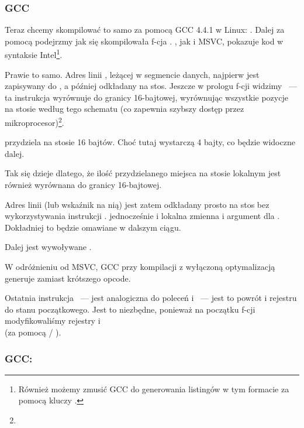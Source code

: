 \subsubsection{GCC}

Teraz chcemy skompilować to samo za pomocą GCC 4.4.1 w Linux: .
Dalej za pomocą \IDA podejrzmy jak się skompilowała f-cja \main.
\IDA, jak i MSVC, pokazuje kod w syntaksie Intel\footnote{Również możemy zmusić GCC do generowania listingów w tym formacie za pomocą kluczy .}.



Prawie to samo. 
Adres linii , leżącej w segmencie danych, najpierw jest zapisywany do \EAX, a później odkładany na stos.
Jeszcze w prologu f-cji widzimy ~--- 
ta instrukcja wyrównuje \ESP do granicy 16-bajtowej, wyrównując wszystkie pozycje 
na stosie według tego schematu (co zapewnia szybszy dostęp przez mikroprocesor)\footnote{\URLWPDA}.

 przydziela na stosie 16 bajtów. Choć tutaj wystarczą 4 bajty, co będzie widoczne dalej.

Tak się dzieje dlatego, że ilość przydzielanego miejsca na stosie lokalnym jest również wyrównana do granicy 16-bajtowej.

Adres linii (lub wskaźnik na nią) jest zatem odkładany prosto na stos bez wykorzystywania instrukcji \PUSH.
 jednocześnie i lokalna zmienna i argument dla \printf{}. Dokładniej to będzie omawiane w dalszym ciągu.

Dalej jest wywoływane \printf.

W odróżnieniu od MSVC, GCC przy kompilacji z wyłączoną optymalizacją generuje  zamiast krótszego opcode.

Ostatnia instrukcja \LEAVE~--- jest analogiczna do poleceń  i ~--- jest to powrót  i rejestru \EBP do stanu początkowego.
Jest to niezbędne, ponieważ na początku f-cji modyfikowaliśmy rejestry \ESP i \EBP{}\\
(za pomocą  / ).

\subsubsection{GCC: \ATTSyntax}
\label{ATT_syntax}

